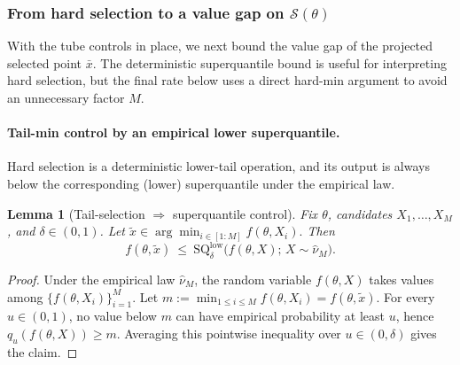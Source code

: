 \documentclass{article}
\theoremstyle{normaltheorem}
\newtheorem{lemma}[lemma]{Lemma}
\newcommand{\calS}{\mathcal{S}}
\begin{document}
\subsubsection{From hard selection to a value gap on $\calS(\theta)$}
With the tube controls in place, we next bound the value gap of the projected selected point \(\bar x\). The deterministic superquantile bound is useful for interpreting hard selection, but the final rate below uses a direct hard-min argument to avoid an unnecessary factor \(M\).

\paragraph{Tail-min control by an empirical lower superquantile.}
Hard selection is a deterministic lower-tail operation, and its output is always below the corresponding
(lower) superquantile under the empirical law.

\begin{lemma}[Tail-selection $\Rightarrow$ superquantile control]\label{lem:tail-to-sq}
Fix $\theta$, candidates $X_1,\dots,X_M$, and $\delta\in(0,1)$. Let
\(
\tilde x \in \arg\min_{i\in[1:M]} f(\theta,X_i).
\)
Then
\[
f(\theta,\tilde x)\ \le\ \mathrm{SQ}^{\mathrm{low}}_\delta\big(f(\theta,X);\,X\sim\widehat\nu_M\big).
\]
\end{lemma}
\begin{proof}
Under the empirical law \(\widehat\nu_M\), the random variable \(f(\theta,X)\) takes values among
\(\{f(\theta,X_i)\}_{i=1}^M\). Let \(m:=\min_{1\le i\le M}f(\theta,X_i)=f(\theta,\tilde x)\).
For every \(u\in(0,1)\), no value below \(m\) can have empirical probability at least \(u\), hence
\(q_u(f(\theta,X))\ge m\). Averaging this pointwise inequality over \(u\in(0,\delta)\) gives the claim.
\end{proof}
\end{document}
